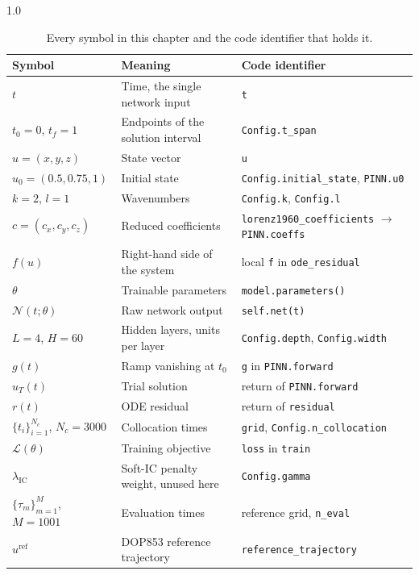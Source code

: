 \begin{table}[H]
\centering
\caption{Every symbol in this chapter and the code identifier that holds it.}
\label{tab:notation}
\begin{spacing}{1.0}
\small
\begin{tabularx}{\textwidth}{|p{2.9cm}|>{\raggedright\arraybackslash}X|p{4.6cm}|}
\hline
\textbf{Symbol} & \textbf{Meaning} & \textbf{Code identifier} \\
\hline
$t$ & Time, the single network input & \texttt{t} \\
\hline
$t_0 = 0$, $t_f = 1$ & Endpoints of the solution interval & \texttt{Config.t\_span} \\
\hline
$u = (x, y, z)$ & State vector & \texttt{u} \\
\hline
$u_0 = (0.5, 0.75, 1)$ & Initial state & \texttt{Config.initial\_state}, \texttt{PINN.u0} \\
\hline
$k = 2$, $l = 1$ & Wavenumbers & \texttt{Config.k}, \texttt{Config.l} \\
\hline
$c = (c_x, c_y, c_z)$ & Reduced coefficients & \texttt{lorenz1960\_coefficients} $\rightarrow$ \texttt{PINN.coeffs} \\
\hline
$f(u)$ & Right-hand side of the system & local \texttt{f} in \texttt{ode\_residual} \\
\hline
$\theta$ & Trainable parameters & \texttt{model.parameters()} \\
\hline
$\mathcal{N}(t;\theta)$ & Raw network output & \texttt{self.net(t)} \\
\hline
$L = 4$, $H = 60$ & Hidden layers, units per layer & \texttt{Config.depth}, \texttt{Config.width} \\
\hline
$g(t)$ & Ramp vanishing at $t_0$ & \texttt{g} in \texttt{PINN.forward} \\
\hline
$u_T(t)$ & Trial solution & return of \texttt{PINN.forward} \\
\hline
$r(t)$ & ODE residual & return of \texttt{residual} \\
\hline
$\{t_i\}_{i=1}^{N_c}$, $N_c = 3000$ & Collocation times & \texttt{grid}, \texttt{Config.n\_collocation} \\
\hline
$\mathcal{L}(\theta)$ & Training objective & \texttt{loss} in \texttt{train} \\
\hline
$\lambda_{\mathrm{IC}}$ & Soft-IC penalty weight, unused here & \texttt{Config.gamma} \\
\hline
$\{\tau_m\}_{m=1}^{M}$, $M = 1001$ & Evaluation times & reference grid, \texttt{n\_eval} \\
\hline
$u^{\mathrm{ref}}$ & DOP853 reference trajectory & \texttt{reference\_trajectory} \\
\hline
\end{tabularx}
\end{spacing}
\end{table}

